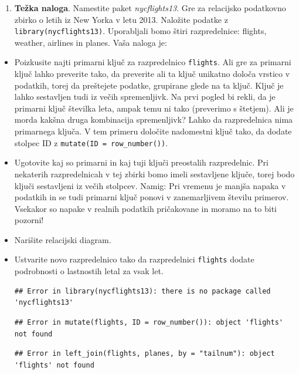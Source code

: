 \documentclass[
]{book}
\providecommand{\tightlist}{%
  \setlength{\itemsep}{0pt}\setlength{\parskip}{0pt}}
\begin{document}
\begin{enumerate}
\def\labelenumi{\arabic{enumi})}
\setcounter{enumi}{3}
\tightlist
\item
  \textbf{Težka naloga}. Namestite paket \emph{nycflights13}. Gre za relacijsko podatkovno zbirko o letih iz New Yorka v letu 2013. Naložite podatke z \texttt{library(nycflights13)}. Uporabljali bomo štiri razpredelnice: flights, weather, airlines in planes. Vaša naloga je:
\end{enumerate}

\begin{itemize}
\item
  Poizkusite najti primarni ključ za razpredelnico \texttt{flights}. Ali gre za primarni ključ lahko preverite tako, da preverite ali ta ključ unikatno določa vrstico v podatkih, torej da preštejete podatke, grupirane glede na ta ključ. Ključ je lahko sestavljen tudi iz večih spremenljivk. Na prvi pogled bi rekli, da je primarni ključ številka leta, ampak temu ni tako (preverimo s štetjem). Ali je morda kakšna druga kombinacija spremenljivk? Lahko da razpredelnica nima primarnega ključa. V tem primeru določite nadomestni ključ tako, da dodate stolpec ID z \texttt{mutate(ID\ =\ row\_number())}.
\item
  Ugotovite kaj so primarni in kaj tuji ključi preostalih razpredelnic. Pri nekaterih razpredelnicah v tej zbirki bomo imeli sestavljene ključe, torej bodo ključi sestavljeni iz večih stolpcev. Namig: Pri vremenu je manjša napaka v podatkih in se tudi primarni ključ ponovi v zanemarljivem številu primerov. Vsekakor so napake v realnih podatkih pričakovane in moramo na to biti pozorni!
\item
  Narišite relacijski diagram.
\item
  Ustvarite novo razpredelnico tako da razpredelnici \texttt{flights} dodate podrobnosti o lastnostih letal za vsak let.

\begin{verbatim}
## Error in library(nycflights13): there is no package called 'nycflights13'
\end{verbatim}

\begin{verbatim}
## Error in mutate(flights, ID = row_number()): object 'flights' not found
\end{verbatim}

\begin{verbatim}
## Error in left_join(flights, planes, by = "tailnum"): object 'flights' not found
\end{verbatim}


\end{itemize}
\end{document}
